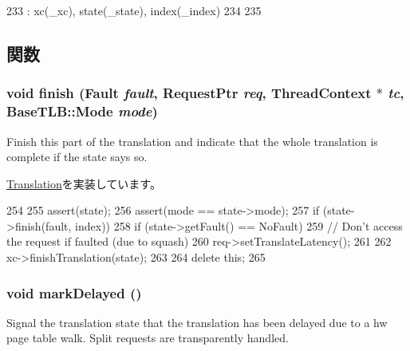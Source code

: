 \begin{DoxyCode}
233         : xc(_xc), state(_state), index(_index)
234     {
235     }
\end{DoxyCode}


\subsection{関数}
\hypertarget{classDataTranslation_a01e7d945def8d2e5df87a169954fa89f}{
\subsubsection[{finish}]{\setlength{\rightskip}{0pt plus 5cm}void finish ({\bf Fault} {\em fault}, \/  {\bf RequestPtr} {\em req}, \/  {\bf ThreadContext} $\ast$ {\em tc}, \/  {\bf BaseTLB::Mode} {\em mode})}}
\label{classDataTranslation_a01e7d945def8d2e5df87a169954fa89f}
Finish this part of the translation and indicate that the whole translation is complete if the state says so. 

\hyperlink{classBaseTLB_1_1Translation_a5698e0a932f298729d10355d4384e565}{Translation}を実装しています。


\begin{DoxyCode}
254     {
255         assert(state);
256         assert(mode == state->mode);
257         if (state->finish(fault, index)) {
258             if (state->getFault() == NoFault) {
259                 // Don't access the request if faulted (due to squash)
260                 req->setTranslateLatency();
261             }
262             xc->finishTranslation(state);
263         }
264         delete this;
265     }
\end{DoxyCode}
\hypertarget{classDataTranslation_ad1fd11d1e352cfc4b329d29b46a19fc4}{
\subsubsection[{markDelayed}]{\setlength{\rightskip}{0pt plus 5cm}void markDelayed ()}}
\label{classDataTranslation_ad1fd11d1e352cfc4b329d29b46a19fc4}
Signal the translation state that the translation has been delayed due to a hw page table walk. Split requests are transparently handled. 

